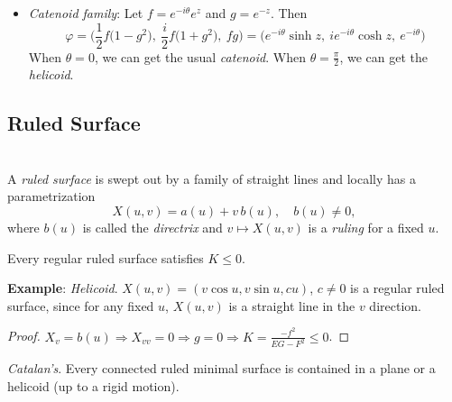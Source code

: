 \noindent\begin{itemize}
\item \textit{Catenoid family}: Let $f = e^{-i\theta}e^z$ and $g = e^{-z}$. Then
\[
\varphi = \Big(\frac{1}{2}f\big(1 - g^2\big),\ \frac{i}{2}f\big(1 + g^2\big),\ fg\Big) = \big(e^{-i\theta}\sinh z,\ ie^{-i\theta}\cosh z,\ e^{-i\theta}\big)
\]
When $\theta = 0$, we can get the usual \textit{catenoid}. When $\theta = \frac{\pi}{2}$, we can get the \textit{helicoid}.
\end{itemize}

\subsection{Ruled Surface}

\\
A \textit{ruled surface} is swept out by a family of straight lines and locally has a parametrization
\[
X(u, v) = a(u) + v\,b(u), \quad b(u)\neq 0,
\]
where $b(u)$ is called the \textit{directrix} and $v\mapsto X(u, v)$ is a \textit{ruling} for a fixed $u$.

\begin{proposition}
Every regular ruled surface satisfies $K\le 0$.
\end{proposition}

\noindent\textbf{Example}: \textit{Helicoid}. $X(u, v) = (v\cos u, v\sin u, cu)$, $c\neq 0$ is a regular ruled surface, since for any fixed $u$, $X(u, v)$ is a straight line in the $v$ direction.

\begin{proof}
$X_v = b(u) \Rightarrow X_{vv} = 0 \Rightarrow g = 0 \Rightarrow K = \frac{-f^2}{EG - F^2}\le 0$.
\end{proof}



\begin{theorem}
\textit{Catalan's}. Every connected ruled minimal surface is contained in a plane or a helicoid (up to a rigid motion).
\end{theorem}

